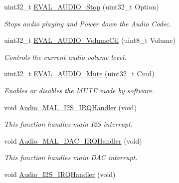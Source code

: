 \begin{DoxyCompactItemize}
uint32\-\_\-t \hyperlink{group___s_t_m32_f4___d_i_s_c_o_v_e_r_y___a_u_d_i_o___c_o_d_e_c___private___functions_gad410eb845ec37a6a2dac0c0bf72f07e1}{E\-V\-A\-L\-\_\-\-A\-U\-D\-I\-O\-\_\-\-Stop} (uint32\-\_\-t Option)
\begin{DoxyCompactList}\small\item\em Stops audio playing and Power down the Audio Codec. \end{DoxyCompactList}\item 
uint32\-\_\-t \hyperlink{group___s_t_m32_f4___d_i_s_c_o_v_e_r_y___a_u_d_i_o___c_o_d_e_c___private___functions_gacc2d90eb028556f428ca8fd703df74bb}{E\-V\-A\-L\-\_\-\-A\-U\-D\-I\-O\-\_\-\-Volume\-Ctl} (uint8\-\_\-t Volume)
\begin{DoxyCompactList}\small\item\em Controls the current audio volume level. \end{DoxyCompactList}\item 
uint32\-\_\-t \hyperlink{group___s_t_m32_f4___d_i_s_c_o_v_e_r_y___a_u_d_i_o___c_o_d_e_c___private___functions_ga03341f700b9a4e485b31efd1f8f440c4}{E\-V\-A\-L\-\_\-\-A\-U\-D\-I\-O\-\_\-\-Mute} (uint32\-\_\-t Cmd)
\begin{DoxyCompactList}\small\item\em Enables or disables the M\-U\-T\-E mode by software. \end{DoxyCompactList}\item 
void \hyperlink{group___s_t_m32_f4___d_i_s_c_o_v_e_r_y___a_u_d_i_o___c_o_d_e_c___private___functions_ga83e59f9e2b833621659a0fdb2f97b3fd}{Audio\-\_\-\-M\-A\-L\-\_\-\-I2\-S\-\_\-\-I\-R\-Q\-Handler} (void)
\begin{DoxyCompactList}\small\item\em This function handles main I2\-S interrupt. \end{DoxyCompactList}\item 
void \hyperlink{group___s_t_m32_f4___d_i_s_c_o_v_e_r_y___a_u_d_i_o___c_o_d_e_c___private___functions_ga21fa45e86c0664d3b0b253f87fefbe0c}{Audio\-\_\-\-M\-A\-L\-\_\-\-D\-A\-C\-\_\-\-I\-R\-Q\-Handler} (void)
\begin{DoxyCompactList}\small\item\em This function handles main D\-A\-C interrupt. \end{DoxyCompactList}\item 
void \hyperlink{group___s_t_m32_f4___d_i_s_c_o_v_e_r_y___a_u_d_i_o___c_o_d_e_c___private___functions_gad3a88187eb447e1d670b5eca7342b65e}{Audio\-\_\-\-I2\-S\-\_\-\-I\-R\-Q\-Handler} (void)

\end{DoxyCompactItemize}
